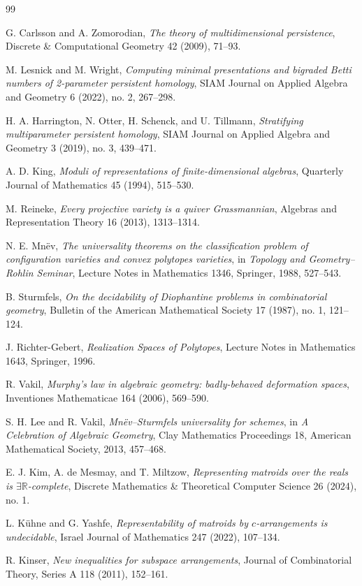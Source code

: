 \documentclass[11pt]{article}
\begin{document}
\begin{thebibliography}{99}

G. Carlsson and A. Zomorodian,
\emph{The theory of multidimensional persistence},
Discrete \& Computational Geometry 42 (2009), 71--93.

M. Lesnick and M. Wright,
\emph{Computing minimal presentations and bigraded Betti numbers of 2-parameter persistent homology},
SIAM Journal on Applied Algebra and Geometry 6 (2022), no. 2, 267--298.

H. A. Harrington, N. Otter, H. Schenck, and U. Tillmann,
\emph{Stratifying multiparameter persistent homology},
SIAM Journal on Applied Algebra and Geometry 3 (2019), no. 3, 439--471.

A. D. King,
\emph{Moduli of representations of finite-dimensional algebras},
Quarterly Journal of Mathematics 45 (1994), 515--530.

M. Reineke,
\emph{Every projective variety is a quiver Grassmannian},
Algebras and Representation Theory 16 (2013), 1313--1314.

N. E. Mn\"ev,
\emph{The universality theorems on the classification problem of configuration varieties and convex polytopes varieties},
in \emph{Topology and Geometry--Rohlin Seminar}, Lecture Notes in Mathematics 1346, Springer, 1988, 527--543.

B. Sturmfels,
\emph{On the decidability of Diophantine problems in combinatorial geometry},
Bulletin of the American Mathematical Society 17 (1987), no. 1, 121--124.

J. Richter-Gebert,
\emph{Realization Spaces of Polytopes},
Lecture Notes in Mathematics 1643, Springer, 1996.

R. Vakil,
\emph{Murphy's law in algebraic geometry: badly-behaved deformation spaces},
Inventiones Mathematicae 164 (2006), 569--590.

S. H. Lee and R. Vakil,
\emph{Mn\"ev--Sturmfels universality for schemes},
in \emph{A Celebration of Algebraic Geometry}, Clay Mathematics Proceedings 18, American Mathematical Society, 2013, 457--468.

E. J. Kim, A. de Mesmay, and T. Miltzow,
\emph{Representing matroids over the reals is \(\exists\mathbb R\)-complete},
Discrete Mathematics \& Theoretical Computer Science 26 (2024), no. 1.

L. K\"uhne and G. Yashfe,
\emph{Representability of matroids by \(c\)-arrangements is undecidable},
Israel Journal of Mathematics 247 (2022), 107--134.

R. Kinser,
\emph{New inequalities for subspace arrangements},
Journal of Combinatorial Theory, Series A 118 (2011), 152--161.

\end{thebibliography}
\end{document}
